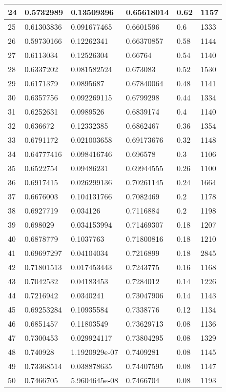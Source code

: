 \begin{longtable}{|l|l|l|l|l|l|}
24 & 0.5732989 & 0.13509396 & 0.65618014 & 0.62 & 1157 \\ \hline 
25 & 0.61303836 & 0.091677465 & 0.6601596 & 0.6 & 1333 \\ \hline 
26 & 0.59730166 & 0.12262341 & 0.66370857 & 0.58 & 1144 \\ \hline 
27 & 0.6113034 & 0.12526304 & 0.66764 & 0.54 & 1140 \\ \hline 
28 & 0.6337202 & 0.081582524 & 0.673083 & 0.52 & 1530 \\ \hline 
29 & 0.6171379 & 0.0895687 & 0.67840064 & 0.48 & 1141 \\ \hline 
30 & 0.6357756 & 0.092269115 & 0.6799298 & 0.44 & 1334 \\ \hline 
31 & 0.6252631 & 0.0989526 & 0.6839174 & 0.4 & 1140 \\ \hline 
32 & 0.636672 & 0.12332385 & 0.6862467 & 0.36 & 1354 \\ \hline 
33 & 0.6791172 & 0.021003658 & 0.69173676 & 0.32 & 1148 \\ \hline 
34 & 0.64777416 & 0.098416746 & 0.696578 & 0.3 & 1106 \\ \hline 
35 & 0.6522754 & 0.09486231 & 0.69944555 & 0.26 & 1100 \\ \hline 
36 & 0.6917415 & 0.026299136 & 0.70261145 & 0.24 & 1664 \\ \hline 
37 & 0.6676003 & 0.104131766 & 0.7082469 & 0.2 & 1178 \\ \hline 
38 & 0.6927719 & 0.034126 & 0.7116884 & 0.2 & 1198 \\ \hline 
39 & 0.698029 & 0.034153994 & 0.71469307 & 0.18 & 1207 \\ \hline 
40 & 0.6878779 & 0.1037763 & 0.71800816 & 0.18 & 1210 \\ \hline 
41 & 0.69697297 & 0.04104034 & 0.7216899 & 0.18 & 2845 \\ \hline 
42 & 0.71801513 & 0.017453443 & 0.7243775 & 0.16 & 1168 \\ \hline 
43 & 0.7042532 & 0.04183453 & 0.7284012 & 0.14 & 1226 \\ \hline 
44 & 0.7216942 & 0.0340241 & 0.73047906 & 0.14 & 1143 \\ \hline 
45 & 0.69253284 & 0.10935584 & 0.7338776 & 0.12 & 1134 \\ \hline 
46 & 0.6851457 & 0.11803549 & 0.73629713 & 0.08 & 1136 \\ \hline 
47 & 0.7300453 & 0.029924117 & 0.73804295 & 0.08 & 1329 \\ \hline 
48 & 0.740928 & 1.1920929e-07 & 0.7409281 & 0.08 & 1145 \\ \hline 
49 & 0.73368514 & 0.038878635 & 0.74407595 & 0.08 & 1147 \\ \hline 
50 & 0.7466705 & 5.9604645e-08 & 0.7466704 & 0.08 & 1193 \\ \hline 
\end{longtable}